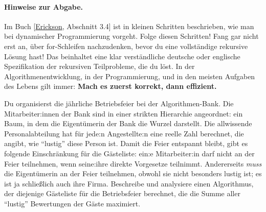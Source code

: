 \documentclass{uebung_cs}
\begin{document}
\paragraph{Hinweise zur Abgabe.}
Im Buch [\href{https://jeffe.cs.illinois.edu/teaching/algorithms/book/Algorithms-JeffE.pdf}{Erickson}, Abschnitt 3.4] ist in kleinen Schritten beschrieben, wie man bei dynamischer Programmierung vorgeht.
Folge diesen Schritten!
Fang gar nicht erst an, über for-Schleifen nachzudenken, bevor du eine vollständige rekursive Lösung hast! Das beinhaltet eine klar verständliche deutsche oder englische Spezifikation der rekursiven Teilprobleme, die du löst.
In der Algorithmenentwicklung, in der Programmierung, und in den meisten Aufgaben des Lebens gilt immer: \textbf{Mach es zuerst korrekt, dann effizient.}

\begin{aufgabe}
    Du organisierst die jährliche Betriebsfeier bei der Algorithmen-Bank.
    Die Mitarbeiter:innen der Bank sind in einer strikten Hierarchie angeordnet: ein Baum, in dem die Eigentümerin der Bank die Wurzel darstellt.
    Die allwissende Personalabteilung hat für jede:n Angestellte:n eine reelle Zahl berechnet, die angibt, wie \enquote{lustig} diese Person ist.
    Damit die Feier entspannt bleibt, gibt es folgende Einschränkung für die Gästeliste:
    ein:e Mitarbeiter:in darf nicht an der Feier teilnehmen, wenn seine:ihre direkte Vorgesetze teilnimmt.
    Andererseits \emph{muss} die Eigentümerin an der Feier teilnehmen, obwohl sie nicht besonders lustig ist; es ist ja schließlich auch ihre Firma.
    Beschreibe und analysiere einen Algorithmus, der diejenige Gästeliste für die Betriebsfeier berechnet, die die Summe aller \enquote{lustig} Bewertungen der Gäste maximiert.
\end{aufgabe}
\end{document}
